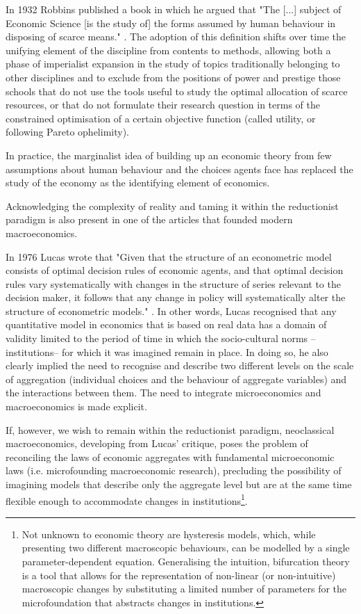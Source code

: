 \documentclass[a4paper, headings=standardclasses]{scrartcl}
\begin{document}
In 1932 Robbins published a book in which he argued that "The [...] subject of Economic Science [is the study of] the forms assumed by human behaviour in disposing of scarce means." \parencite[p. 15]{robbins2007}.
The adoption of this definition shifts over time the unifying element of the discipline from contents to methods, allowing both a phase of imperialist expansion in the study of topics traditionally belonging to other disciplines \parencite[see][]{stigler1984, lazear2000} and to exclude from the positions of power and prestige those schools that do not use the tools useful to study the optimal allocation of scarce resources, or that do not formulate their research question in terms of the constrained optimisation of a certain objective function (called utility, or following Pareto ophelimity).

In practice, the marginalist idea of building up an economic theory from few assumptions about human behaviour and the choices agents face has replaced the study of the economy as the identifying element of economics.

Acknowledging the complexity of reality and taming it within the reductionist paradigm is also present in one of the articles that founded modern macroeconomics.

In 1976 Lucas wrote that "Given that the structure of an econometric model consists of optimal decision rules of economic agents, and that optimal decision rules vary systematically with changes in the structure of series relevant to the decision maker, it follows that any change in policy will systematically alter the structure of econometric models." \parencite{lucas1976}.
In other words, Lucas recognised that any quantitative model in economics that is based on real data has a domain of validity limited to the period of time in which the socio-cultural norms --institutions-- for which it was imagined remain in place.
In doing so, he also clearly implied the need to recognise and describe two different levels on the scale of aggregation (individual choices and the behaviour of aggregate variables) and the interactions between them. The need to integrate microeconomics and macroeconomics is made explicit.

If, however, we wish to remain within the reductionist paradigm, neoclassical macroeconomics, developing from Lucas' critique, poses the problem of reconciling the laws of economic aggregates with fundamental microeconomic laws (i.e. microfounding macroeconomic research), precluding the possibility of imagining models that describe only the aggregate level but are at the same time flexible enough to accommodate changes in institutions\footnote{Not unknown to economic theory are hysteresis models, which, while presenting two different macroscopic behaviours, can be modelled by a single parameter-dependent equation. Generalising the intuition, bifurcation theory is a tool that allows for the representation of non-linear (or non-intuitive) macroscopic changes by substituting a limited number of parameters for the microfoundation that abstracts changes in institutions.}.
\end{document}
